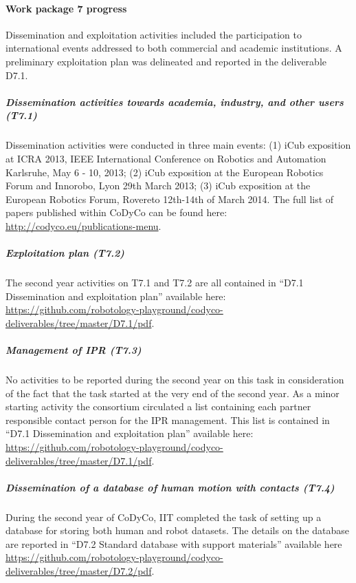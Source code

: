 

\paragraph{Work package 7 progress}

Dissemination and exploitation activities included the participation to international events addressed to both commercial and academic institutions. A preliminary exploitation plan was delineated and reported in the deliverable D7.1.

\subparagraph{Dissemination activities towards academia, industry, and other users (T7.1)}

Dissemination activities were conducted in three main events: (1) iCub exposition at ICRA 2013, IEEE International Conference on Robotics and Automation Karlsruhe, May 6 - 10, 2013; (2) iCub exposition at the European Robotics Forum and Innorobo, Lyon 29th March 2013; (3) iCub exposition at the European Robotics Forum, Rovereto 12th-14th of March 2014. The full list of papers published within CoDyCo can be found here: \url{http://codyco.eu/publications-menu}.

\subparagraph{Exploitation plan (T7.2)}

The second year activities on T7.1 and T7.2 are all contained in ``D7.1 Dissemination and exploitation plan'' available here: \url{https://github.com/robotology-playground/codyco-deliverables/tree/master/D7.1/pdf}.

\subparagraph{Management of IPR (T7.3)}

No activities to be reported during the second year on this task in consideration of the fact that the task started at the very end of the second year. As a minor starting activity the consortium circulated a list containing each partner responsible contact person for the IPR management. This list is contained in ``D7.1 Dissemination and exploitation plan'' available here: \url{https://github.com/robotology-playground/codyco-deliverables/tree/master/D7.1/pdf}.

\subparagraph{Dissemination of a database of human motion with contacts (T7.4)}

During the second year of CoDyCo, IIT completed the task of setting up a database for storing both human and robot datasets. The details on the database are reported in ``D7.2 Standard database with support materials'' available here \url{https://github.com/robotology-playground/codyco-deliverables/tree/master/D7.2/pdf}. 


